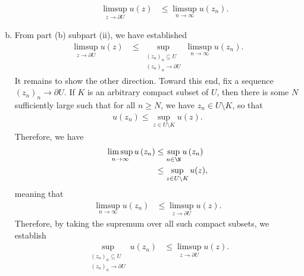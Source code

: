 \documentclass[10pt]{mypackage}
\begin{document}
\begin{solution}
\begin{enumerate}[(a)]
\begin{enumerate}[(i)]
          \begin{align*}
            \limsup_{z\rightarrow \partial U} u(z) &\leq \limsup_{n\rightarrow \infty} u\left( z_n \right).
          \end{align*}
      \end{enumerate}
    \item From part (b) subpart (ii), we have established
      \begin{align*}
      \limsup_{z\rightarrow \partial U} u(z) &\leq \sup_{\substack{\left( z_n \right)_n\subseteq U\\\left( z_n \right)_n\rightarrow \partial U}} \limsup_{n\rightarrow\infty} u\left( z_n \right).
      \end{align*}
      It remains to show the other direction. Toward this end, fix a sequence $\left( z_n \right)_n\rightarrow \partial U$. If $K$ is an arbitrary compact subset of $U$, then there is some $N$ sufficiently large such that for all $n\geq N$, we have $z_n\in U\setminus K$, so that
      \begin{align*}
        u\left( z_n \right) \leq \sup_{z\in U\setminus K} u(z).
      \end{align*}
      Therefore, we have
      \begin{align*}
        \limsup_{n\rightarrow\infty} u\left( z_n \right) &\leq \sup_{n\in\N} u\left( z_n \right)\\
                                                         &\leq \sup_{z\in U\setminus K}u(z),
      \end{align*}
      meaning that
      \begin{align*}
        \limsup_{n\rightarrow\infty} u\left( z_n \right) &\leq \limsup_{z\rightarrow\partial U} u\left( z \right).
      \end{align*}
      Therefore, by taking the supremum over all such compact subsets, we establish
      \begin{align*}
      \sup_{\substack{\left( z_n \right)_n\subseteq U\\\left( z_n \right)_n\rightarrow \partial U}} u\left( z_n \right) &\leq \limsup_{z\rightarrow\partial U} u\left( z \right).
      \end{align*}
  \end{enumerate}
\end{solution}
\end{document}
